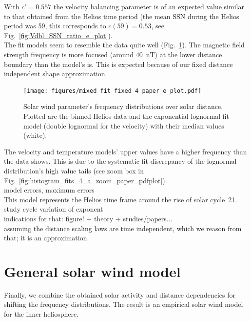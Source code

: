 With $c' = 0.557$ the velocity balancing parameter is of an expected value similar to that obtained from the Helios time period (the mean SSN during the Helios period was 59, this corresponds to $c(59) = 0.53$, see Fig.~\ref{fig:Vdbl_SSN_ratio_e_plot}).\\

The fit models seem to resemble the data quite well (Fig.~\ref{fig:mixed_fit_fixed_4_paper_e_plot}). The magnetic field strength frequency is more focused (around \SI{40}{nT}) at the lower distance boundary than the model's is. This is expected because of our fixed distance independent shape approximation.\\
\begin{figure}
	\texttt{[image: figures/mixed\_fit\_fixed\_4\_paper\_e\_plot.pdf]}
	\caption{Solar wind parameter's frequency distributions over solar distance. Plotted are the binned Helios data and the exponential lognormal fit model (double lognormal for the velocity) with their median values (white).}
	\label{fig:mixed_fit_fixed_4_paper_e_plot}
\end{figure}

The velocity and temperature models' upper values have a higher frequency than the data shows. This is due to the systematic fit discrepancy of the lognormal distribution's high value tails (see zoom box in Fig.~\ref{fig:histogram_fits_4_a_zoom_paper_pdfplot}).\\

model errors, maximum errors\\

This model represents the Helios time frame around the rise of solar cycle~21.\\

study cycle variation of exponent\\
indications for that: figure! + theory + studies/papers...\\
assuming the distance scaling laws are time independent, which we reason from that; it is an approximation\\


\section{General solar wind model}
\label{sec:general_solar_wind_model}

Finally, we combine the obtained solar activity and distance dependencies for shifting the frequency distributions. The result is an empirical solar wind model for the inner heliosphere.\\

